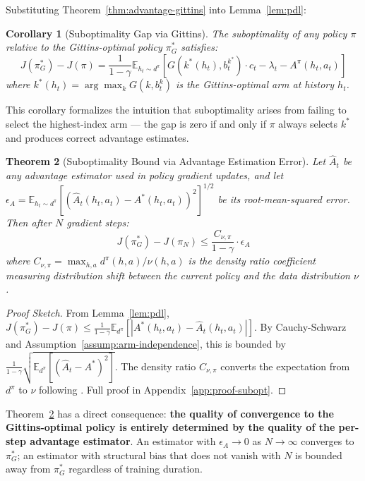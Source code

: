 \documentclass[11pt]{article}
\theoremstyle{plain}
\newtheorem{theorem}{Theorem}[section]
\newtheorem{corollary}[theorem]{Corollary}
\theoremstyle{definition}
\theoremstyle{remark}
\begin{document}
Substituting Theorem~\ref{thm:advantage-gittins} into 
Lemma~\ref{lem:pdl}:

\begin{corollary}[Suboptimality Gap via Gittins]
\label{cor:subopt-gittins}
The suboptimality of any policy $\pi$ relative to the 
Gittins-optimal policy $\pi^*_G$ satisfies:
$$J(\pi^*_G) - J(\pi) = 
\frac{1}{1-\gamma} \mathbb{E}_{h_t \sim d^\pi}
\!\left[G(k^*(h_t), b_t^{k^*}) \cdot c_t - \lambda_t - 
A^\pi(h_t, a_t)\right]$$
where $k^*(h_t) = \arg\max_k G(k, b_t^k)$ is the 
Gittins-optimal arm at history $h_t$.
\end{corollary}

This corollary formalizes the intuition that suboptimality 
arises from failing to select the highest-index arm — the gap 
is zero if and only if $\pi$ always selects $k^*$ and produces 
correct advantage estimates.

\begin{theorem}[Suboptimality Bound via Advantage Estimation Error]
\label{thm:subopt-bound}
Let $\hat{A}_t$ be any advantage estimator used in policy 
gradient updates, and let 
$\epsilon_A = \mathbb{E}_{h_t \sim d^\pi}\!\left[
(\hat{A}_t(h_t, a_t) - A^*(h_t, a_t))^2\right]^{1/2}$ 
be its root-mean-squared error. Then after $N$ gradient steps:
$$J(\pi^*_G) - J(\pi_N) \leq 
\frac{C_{\nu,\pi}}{1-\gamma} \cdot \epsilon_A$$
where $C_{\nu,\pi} = \max_{h,a} d^\pi(h,a)/\nu(h,a)$ is the 
density ratio coefficient measuring distribution shift between 
the current policy and the data distribution $\nu$.
\end{theorem}

\begin{proof}[Proof Sketch]
From Lemma~\ref{lem:pdl}, $J(\pi^*_G) - J(\pi) \leq 
\frac{1}{1-\gamma} \mathbb{E}_{d^\pi}[|A^*(h_t,a_t) - 
\hat{A}_t(h_t,a_t)|]$. By Cauchy-Schwarz and 
Assumption~\ref{assump:arm-independence}, this is bounded by 
$\frac{1}{1-\gamma} \sqrt{\mathbb{E}_{d^\pi}[(\hat{A}_t - 
A^*)^2]}$. The density ratio $C_{\nu,\pi}$ converts the 
expectation from $d^\pi$ to $\nu$ following 
\citet{zhan2022offline}.
Full proof in Appendix~\ref{app:proof-subopt}.
\end{proof}

Theorem~\ref{thm:subopt-bound} has a direct consequence: 
\textbf{the quality of convergence to the Gittins-optimal policy 
is entirely determined by the quality of the per-step advantage 
estimator}. An estimator with $\epsilon_A \to 0$ as $N \to 
\infty$ converges to $\pi^*_G$; an estimator with structural 
bias that does not vanish with $N$ is bounded away from 
$\pi^*_G$ regardless of training duration.
\end{document}
